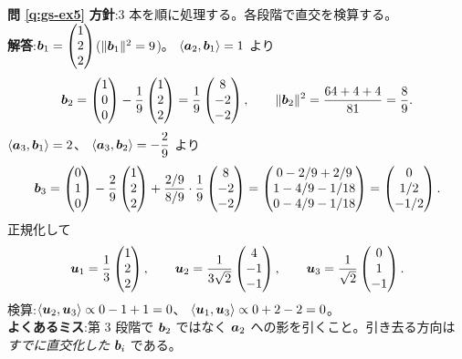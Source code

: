 \bigskip
\noindent\textbf{問 \ref{q:gs-ex5}}\quad
\textbf{方針}:$3$ 本を順に処理する。各段階で直交を検算する。\\
\textbf{解答}:$\bm{b}_1 = \begin{pmatrix}1 \\ 2 \\ 2\end{pmatrix}$($\|\bm{b}_1\|^2 = 9$)。
$\langle \bm{a}_2, \bm{b}_1 \rangle = 1$ より
\[
\bm{b}_2 = \begin{pmatrix}1 \\ 0 \\ 0\end{pmatrix} - \frac{1}{9}\begin{pmatrix}1 \\ 2 \\ 2\end{pmatrix}
= \frac{1}{9}\begin{pmatrix}8 \\ -2 \\ -2\end{pmatrix}, \qquad
\|\bm{b}_2\|^2 = \frac{64 + 4 + 4}{81} = \frac{8}{9}.
\]
$\langle \bm{a}_3, \bm{b}_1 \rangle = 2$、
$\langle \bm{a}_3, \bm{b}_2 \rangle = -\dfrac{2}{9}$ より
\[
\bm{b}_3 = \begin{pmatrix}0 \\ 1 \\ 0\end{pmatrix} - \frac{2}{9}\begin{pmatrix}1 \\ 2 \\ 2\end{pmatrix}
+ \frac{2/9}{8/9} \cdot \frac{1}{9}\begin{pmatrix}8 \\ -2 \\ -2\end{pmatrix}
= \begin{pmatrix}0 - 2/9 + 2/9 \\ 1 - 4/9 - 1/18 \\ 0 - 4/9 - 1/18\end{pmatrix}
= \begin{pmatrix}0 \\ 1/2 \\ -1/2\end{pmatrix}.
\]
正規化して
\[
\bm{u}_1 = \frac{1}{3}\begin{pmatrix}1 \\ 2 \\ 2\end{pmatrix}, \qquad
\bm{u}_2 = \frac{1}{3\sqrt{2}}\begin{pmatrix}4 \\ -1 \\ -1\end{pmatrix}, \qquad
\bm{u}_3 = \frac{1}{\sqrt{2}}\begin{pmatrix}0 \\ 1 \\ -1\end{pmatrix}.
\]
検算:$\langle \bm{u}_2, \bm{u}_3 \rangle \propto 0 - 1 + 1 = 0$、
$\langle \bm{u}_1, \bm{u}_3 \rangle \propto 0 + 2 - 2 = 0$。\\
\textbf{よくあるミス}:第 $3$ 段階で $\bm{b}_2$ ではなく
$\bm{a}_2$ への影を引くこと。引き去る方向は
\emph{すでに直交化した} $\bm{b}_i$ である。

